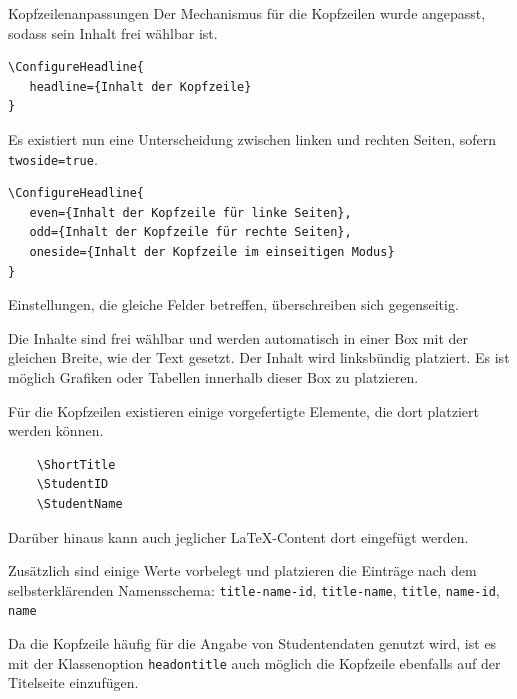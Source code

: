 \documentclass[
	ngerman,
	points=true,%
	]{tudaexercise}
\let\code\texttt
\begin{document}
\begin{task}{Kopfzeilenanpassungen}
Der Mechanismus für die Kopfzeilen wurde angepasst, sodass sein Inhalt frei wählbar ist.

\begin{verbatim}
\ConfigureHeadline{
   headline={Inhalt der Kopfzeile}
}
\end{verbatim}

Es existiert nun eine Unterscheidung zwischen linken und rechten Seiten, sofern \code{twoside=true}.

\begin{verbatim}
\ConfigureHeadline{
   even={Inhalt der Kopfzeile für linke Seiten},
   odd={Inhalt der Kopfzeile für rechte Seiten},
   oneside={Inhalt der Kopfzeile im einseitigen Modus}
}
\end{verbatim}

Einstellungen, die gleiche Felder betreffen, überschreiben sich gegenseitig.

\begin{subtask}
Die Inhalte sind frei wählbar und werden automatisch in einer Box mit der gleichen Breite, wie der Text gesetzt. Der Inhalt wird linksbündig platziert. Es ist möglich Grafiken oder Tabellen innerhalb dieser Box zu platzieren.
\end{subtask}

\begin{subtask}
Für die Kopfzeilen existieren einige vorgefertigte Elemente, die dort platziert werden können.
\begin{verbatim}
	\ShortTitle
	\StudentID
	\StudentName
\end{verbatim}
Darüber hinaus kann auch jeglicher \LaTeX-Content dort eingefügt werden.

Zusätzlich sind einige Werte vorbelegt und platzieren die Einträge nach dem selbsterklärenden Namensschema:
\code{title-name-id}, \code{title-name}, \code{title}, \code{name-id}, \code{name}
\end{subtask}

\begin{subtask}
Da die Kopfzeile häufig für die Angabe von Studentendaten genutzt wird, ist es mit der Klassenoption \code{headontitle} auch möglich die Kopfzeile ebenfalls auf der Titelseite einzufügen.
\end{subtask}
\end{task}
\end{document}
